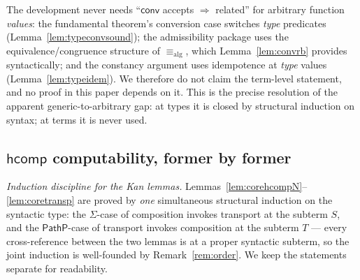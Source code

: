 \documentclass{lmcs}
\newcommand{\hcomp}{\mathsf{hcomp}}
\newcommand{\aconv}{\equiv_{\mathrm{alg}}}
\newcommand{\convop}{\mathsf{conv}}
\begin{document}
\begin{rem}
  \label{rem:nosemconv}
  The development never needs ``$\convop$ accepts $\Rightarrow$
  related'' for arbitrary function \emph{values}: the fundamental
  theorem's conversion case switches \emph{type} predicates
  (Lemma~\ref{lem:typeconvsound}); the admissibility package uses
  the equivalence/congruence structure of $\aconv$, which
  Lemma~\ref{lem:convrb} provides syntactically; and the constancy
  argument uses idempotence at \emph{type} values
  (Lemma~\ref{lem:typeidem}).  We therefore do not claim the
  term-level statement, and no proof in this paper depends on it.
  This is the precise resolution of the apparent
  generic-to-arbitrary gap: at types it is closed by structural
  induction on syntax; at terms it is never used.
\end{rem}

\subsection{$\hcomp$ computability, former by former}
\label{app:corehcomp}

\noindent\emph{Induction discipline for the Kan lemmas.}
Lemmas~\ref{lem:corehcompN}--\ref{lem:coretransp} are proved by
\emph{one} simultaneous structural induction on the syntactic type:
the $\Sigma$-case of composition invokes transport at the subterm
$S$, and the $\mathsf{PathP}$-case of transport invokes composition
at the subterm $T$ --- every cross-reference between the two lemmas
is at a proper syntactic subterm, so the joint induction is
well-founded by Remark~\ref{rem:order}.  We keep the statements
separate for readability.
\end{document}
